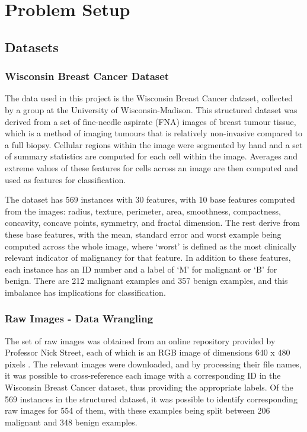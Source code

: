 \documentclass{article}
\begin{document}
	\section{Problem Setup}
	\subsection{Datasets}
	\subsubsection{Wisconsin Breast Cancer Dataset}
	The data used in this project is the Wisconsin Breast Cancer dataset, collected by a group at the University of Wisconsin-Madison. This structured dataset was derived from a set of fine-needle aspirate (FNA) images of breast tumour tissue, which is a method of imaging tumours that is relatively non-invasive compared to a full biopsy. Cellular regions within the image were segmented by hand and a set of summary statistics are computed for each cell within the image. Averages and extreme values of these features for cells across an image are then computed and used as features for classification.
	
	The dataset has 569 instances with 30 features, with 10 base features computed from the images: radius, texture, perimeter, area, smoothness, compactness, concavity, concave points, symmetry, and fractal dimension. The rest derive from these base features, with the mean, standard error and worst example being computed across the whole image, where `worst' is defined as the most clinically relevant indicator of malignancy for that feature. In addition to these features, each instance has an ID number and a label of `M' for malignant or `B' for benign. There are 212 malignant examples and 357 benign examples, and this imbalance has implications for classification. 
	\subsubsection{Raw Images - Data Wrangling}


	The set of raw images was obtained from an online repository provided by Professor Nick Street, each of which is an RGB image of dimensions 640 x 480 pixels \cite{NickStreetWebsite}. The relevant images were downloaded, and by processing their file names, it was possible to cross-reference each image with a corresponding ID in the Wisconsin Breast Cancer dataset, thus providing the appropriate labels. Of the 569 instances in the structured dataset, it was possible to identify corresponding raw images for 554 of them, with these examples being split between 206 malignant and 348 benign examples.
	
\end{document}
